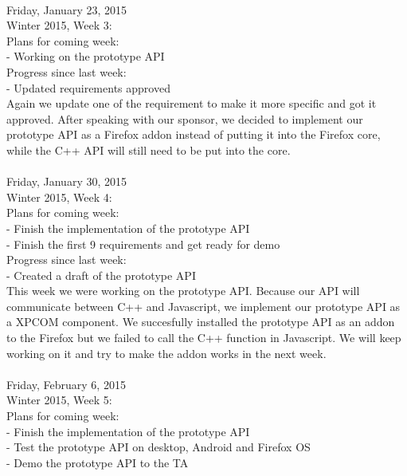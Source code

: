 {\hrulefill \\
Friday, January 23, 2015 \\
Winter 2015, Week 3: \\

Plans for coming week: \\
- Working on the prototype API \\

Progress since last week: \\
- Updated requirements approved \\

Again we update one of the requirement to make it more specific and got it approved. After speaking with our sponsor, we decided to implement our prototype API as a Firefox addon instead of putting it into the Firefox core, while the  C++ API will still need to be put into the core. \\

\hrulefill \\
Friday, January 30, 2015 \\
Winter 2015, Week 4: \\

Plans for coming week: \\
- Finish the implementation of the prototype API \\
- Finish the first 9 requirements and get ready for demo \\

Progress since last week: \\
- Created a draft of the prototype API \\

This week we were working on the prototype API. Because our API will communicate between C++ and Javascript, we implement our prototype API as a XPCOM component. We succesfully installed the prototype API as an addon to the Firefox but we failed to call the C++ function in Javascript. We will keep working on it and try to make the addon works in the next week. \\

\hrulefill \\
Friday, February 6, 2015 \\
Winter 2015, Week 5: \\

Plans for coming week: \\
- Finish the implementation of the prototype API \\
- Test the prototype API on desktop, Android and Firefox OS \\
- Demo the prototype API to the TA \\

}
